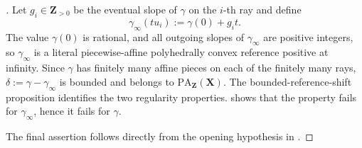 \begin{proof}[]
Let $g_i\in\mathbf Z_{>0}$ be the eventual slope of $\gamma$ on the $i$-th
ray and define
\[
                   \gamma_\infty(tu_i):=\gamma(0)+g_i t.
\]
The value $\gamma(0)$ is rational, and all outgoing slopes of
$\gamma_\infty$ are positive integers, so $\gamma_\infty$ is a literal
piecewise-affine polyhedrally convex reference positive at infinity.  Since
$\gamma$ has finitely many affine pieces on each of the finitely many rays,
$\delta:=\gamma-\gamma_\infty$ is bounded and belongs to
$\mathrm{PA}_{\mathbf Z}(\mathbf X)$.  The bounded-reference-shift
proposition identifies the two regularity properties.
 shows that
the property fails for $\gamma_\infty$, hence it fails for $\gamma$.

The final assertion follows directly from the opening hypothesis in
\cite[Definition~6.9]{BMPS26}.
\end{proof}
